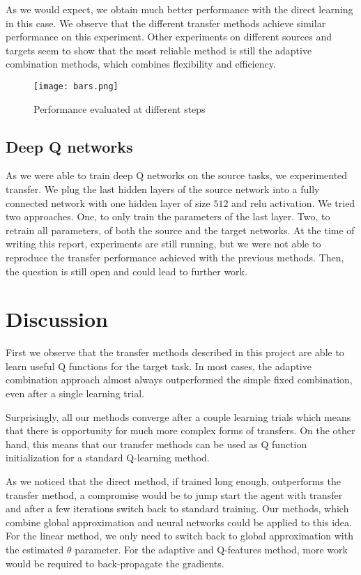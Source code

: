 \documentclass{article}
\begin{document}
As we would expect, we obtain much better performance with the direct learning in this case. We observe that the different transfer methods achieve similar performance on this experiment. Other experiments on different sources and targets seem to show that the most reliable method is still the adaptive combination methods, which combines flexibility and efficiency. 
\begin{figure}
\centering
\texttt{[image: bars.png]}
\caption{Performance evaluated at different steps}
\label{fig:bars}
\end{figure}

\subsection{Deep Q networks}

As we were able to train deep Q networks on the source tasks, we experimented transfer. We plug the last hidden layers of the source network into a fully connected network with one hidden layer of size $512$ and relu activation. We tried two approaches. One, to only train the parameters of the last layer. Two, to retrain all parameters, of both the source and the target networks. At the time of writing this report, experiments are still running, but we were not able to reproduce the transfer performance achieved with the previous methods. Then, the question is still open and could lead to further work.


\section{Discussion}
First we observe that the transfer methods described in this project are able to learn useful Q functions for the target task. In most cases, the adaptive combination approach almost always outperformed the simple fixed combination, even after a single learning trial.

Surprisingly, all our methods converge after a couple learning trials which means that there is opportunity for much more complex forms of transfers. On the other hand, this means that our transfer methods can be used as Q function initialization for a standard Q-learning method.

As we noticed that the direct method, if trained long enough, outperforms the transfer method, a compromise would be to jump start the agent with transfer and after a few iterations switch back to standard training. Our methods, which combine global approximation and neural networks could be applied to this idea. For the linear method, we only need to switch back to global approximation with the estimated $ \theta $ parameter. For the adaptive and Q-features method, more work would be required to back-propagate the gradients. 
\end{document}
